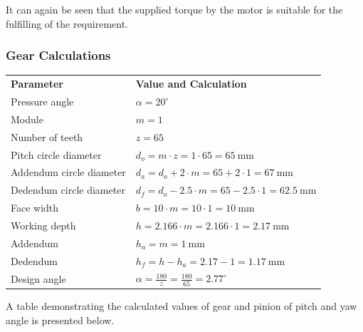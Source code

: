 \documentclass[12pt]{report}
\renewcommand{\arraystretch}{1.2} %
\begin{document}
It can again be seen that the supplied torque by the motor is suitable for the fulfilling of the requirement.

\subsubsection{Gear Calculations}

\begin{table}[ht]
\centering
\renewcommand{\arraystretch}{1.5}
\setlength{\tabcolsep}{10pt}
\begin{tabular}{>{\raggedright\arraybackslash}p{5cm} >{\raggedright\arraybackslash}p{8cm}}
\textbf{Parameter}          & \textbf{Value and Calculation} \\ 
Pressure angle              & $\alpha = 20^\circ$ \\ 
Module                     & $m = 1$ \\ 
Number of teeth             & $z = 65$ \\ 
Pitch circle diameter       & $d_o = m \cdot z = 1 \cdot 65 = 65\ \text{mm}$ \\ 
Addendum circle diameter    & $d_a = d_o + 2 \cdot m = 65 + 2 \cdot 1 = 67\ \text{mm}$ \\ 
Dedendum circle diameter    & $d_f = d_o - 2.5 \cdot m = 65 - 2.5 \cdot 1 = 62.5\ \text{mm}$ \\ 
Face width                  & $b = 10 \cdot m = 10 \cdot 1 = 10\ \text{mm}$ \\ 
Working depth               & $h = 2.166 \cdot m = 2.166 \cdot 1 = 2.17\ \text{mm}$ \\ 
Addendum                    & $h_a = m = 1\ \text{mm}$ \\ 
Dedendum                    & $h_f = h - h_a = 2.17 - 1 = 1.17\ \text{mm}$ \\ 
Design angle                & $\alpha = \frac{180}{z} = \frac{180}{65} = 2.77^\circ$ \\ 
\end{tabular}
\label{tab:gear_parameters}
\end{table}
\newpage

A table demonstrating the calculated values of gear and pinion of pitch and yaw angle is presented below.
\end{document}
